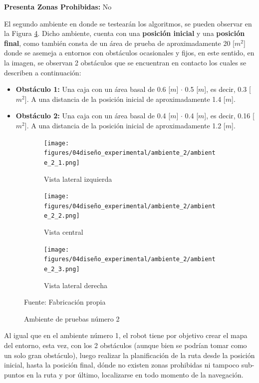 \hspace{5mm} \textbf{Presenta Zonas Prohibidas:} No

El segundo ambiente en donde se testearán los algoritmos, se pueden observar en la Figura \ref{fig:ambiente_2}. Dicho ambiente, cuenta con una \textbf{posición inicial} y una \textbf{posición final}, como también consta de un área de prueba de aproximadamente 20 [$m^{2}$] donde se asemeja a entornos con obstáculos ocasionales y fijos, en este sentido, en la imagen, se observan 2 obstáculos que se encuentran en contacto los cuales se describen a continuación:
\begin{itemize}
    \item \textbf{Obstáculo 1:} Una caja con un área basal de 0.6 [$m$] $\cdot$ 0.5 [$m$], es decir, 0.3 [$m^{2}$]. A una distancia de la posición inicial de aproximadamente 1.4 [$m$].
    \item \textbf{Obstáculo 2:} Una caja con un área basal de 0.4 [$m$] $\cdot$ 0.4 [$m$], es decir, 0.16 [$m^{2}$]. A una distancia de la posición inicial de aproximadamente 1.2 [$m$].
\end{itemize} 

\begin{figure}[H]
    \centering
    \begin{subfigure}[b]{0.30\textwidth}
    \texttt{[image: figures/04diseño\_experimental/ambiente\_2/ambiente\_2\_1.png]}
    \caption{Vista lateral izquierda}
    \label{fig:ambiente_2_1}
    \end{subfigure}
    \begin{subfigure}[b]{0.30\textwidth}
    \texttt{[image: figures/04diseño\_experimental/ambiente\_2/ambiente\_2\_2.png]}
    \caption{Vista central}
    \label{fig:ambiente_2_2}
    \end{subfigure}
    \begin{subfigure}[b]{0.30\textwidth}
    \texttt{[image: figures/04diseño\_experimental/ambiente\_2/ambiente\_2\_3.png]}
    \caption{Vista lateral derecha}
    \label{fig:ambiente_2_3}
    \end{subfigure}
    \caption{Ambiente de pruebas número 2 }
    Fuente: Fabricación propia
    \label{fig:ambiente_2}
\end{figure} 

Al igual que en el ambiente número 1, el robot tiene por objetivo crear el mapa del entorno, esta vez, con los 2 obstáculos (aunque bien se podrían tomar como un solo gran obstáculo), luego realizar la planificación de la ruta desde la posición inicial, hasta la posición final, dónde no existen zonas prohibidas ni tampoco sub-puntos en la ruta y por último, localizarse en todo momento de la navegación. 

